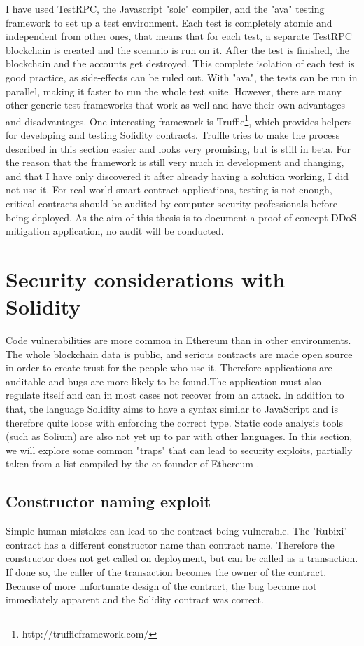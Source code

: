 I have used TestRPC, the Javascript "solc" compiler, and the "ava" testing framework to set up a test environment. Each test is completely atomic and independent from other ones, that means that for each test, a separate TestRPC blockchain is created and the scenario is run on it. After the test is finished, the blockchain and the accounts get destroyed. This complete isolation of each test is good practice, as side-effects can be ruled out. With "ava", the tests can be run in parallel, making it faster to run the whole test suite. However, there are many other generic test frameworks that work as well and have their own advantages and disadvantages. One interesting framework is Truffle\footnote{http://truffleframework.com/}, which provides helpers for developing and testing Solidity contracts. Truffle tries to make the process described in this section easier and looks very promising, but is still in beta. For the reason that the framework is still very much in development and changing, and that I have only discovered it after already having a solution working, I did not use it.
For real-world smart contract applications, testing is not enough, critical contracts should be audited by computer security professionals before being deployed. As the aim of this thesis is to document a proof-of-concept DDoS mitigation application, no audit will be conducted.

\section{Security considerations with Solidity}
Code vulnerabilities are more common in Ethereum than in other environments. The whole blockchain data is public, and serious contracts are made open source in order to create trust for the people who use it. Therefore applications are auditable and bugs are more likely to be found.The application must also regulate itself and can in most cases not recover from an attack.
In addition to that, the language Solidity aims to have a syntax similar to JavaScript and is therefore quite loose with enforcing the correct type. Static code analysis tools (such as Solium) are also not yet up to par with other languages.
In this section, we will explore some common "traps" that can lead to security exploits, partially taken from a list compiled by the co-founder of Ethereum \cite{ThinkingAboutSmartContractSecurity}.

\subsection{Constructor naming exploit}
Simple human mistakes can lead to the contract being vulnerable. The 'Rubixi' contract has a different constructor name than contract name. Therefore the constructor does not get called on deployment, but can be called as a transaction. If done so, the caller of the transaction becomes the owner of the contract. Because of more unfortunate design of the contract, the bug became not immediately apparent and the Solidity contract was correct.

